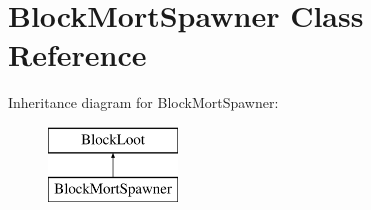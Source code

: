 \hypertarget{class_block_mort_spawner}{}\section{Block\+Mort\+Spawner Class Reference}
\label{class_block_mort_spawner}
Inheritance diagram for Block\+Mort\+Spawner\+:\begin{figure}[H]
\begin{center}
\leavevmode
\includegraphics[height=2.000000cm]{d9/d66/class_block_mort_spawner}
\end{center}
\end{figure}
